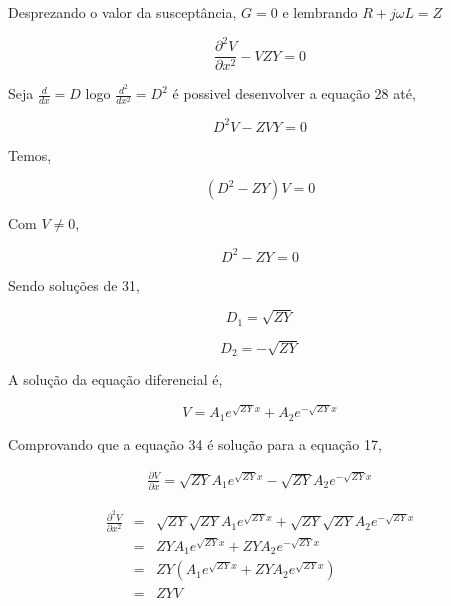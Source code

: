 \documentclass[a4paper, 10pt]{article}
\begin{document}
Desprezando o valor da susceptância, $G = 0$ e lembrando $R+j \omega L = Z$

\begin{equation}
\frac{\partial^2 V}{\partial x^2} - V Z Y = 0
\end{equation}

Seja $\frac{d}{d x} = D$ logo $\frac{d^2}{d x^2} = D^2$ é possivel desenvolver a equação 28 até,

\begin{equation}
D^2 V - Z V Y = 0
\end{equation}

Temos,

\begin{equation}
(D^2 - Z Y)V = 0
\end{equation}

Com $V \neq 0$,

\begin{equation}
D^2 - Z Y = 0
\end{equation}

Sendo soluções de 31,

\begin{equation}
D_1 = \sqrt{Z Y}
\end{equation}

\begin{equation}
D_2 = -\sqrt{Z Y}
\end{equation}

A solução da equação diferencial é,

\begin{equation}
V = A_1 e^{\sqrt{Z Y} x} + A_2 e^{-\sqrt{Z Y} x}
\end{equation}

Comprovando que a equação 34 é solução para a equação 17,

\begin{eqnarray*}
\frac{\partial V}{\partial x} = \sqrt{Z Y} A_1 e^{\sqrt{Z Y}x} - \sqrt{Z Y} A_2 e^{-\sqrt{Z Y}x}
\end{eqnarray*}

\begin{eqnarray}
\frac{\partial^2 V}{\partial x^2} &=& \sqrt{Z Y} \sqrt{Z Y} A_1 e^{\sqrt{Z Y}x} + \sqrt{Z Y} \sqrt{Z Y} A_2 e^{-\sqrt{Z Y}x} \nonumber\\
&=& Z Y A_1 e^{\sqrt{Z Y}x} + Z Y A_2 e^{-\sqrt{Z Y}x}\nonumber\\
&=& Z Y \left( A_1 e^{\sqrt{Z Y}x} + Z Y A_2 e^{\sqrt{Z Y}x} \right)\nonumber\\
&=& Z Y V
\end{eqnarray}
\end{document}
